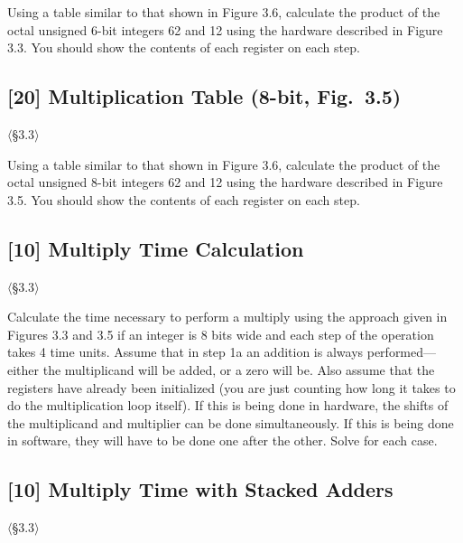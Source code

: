 \noindent Using a table similar to that shown in Figure 3.6, calculate the
product of the octal unsigned 6-bit integers 62 and 12 using the hardware
described in Figure 3.3. You should show the contents of each register on
each step.

\problembreak

\subsection{[20] Multiplication Table (8-bit, Fig.~3.5)}
\hypertarget{prob-3.13}{}
\noindent$\langle$\S3.3$\rangle$\medskip

\noindent Using a table similar to that shown in Figure 3.6, calculate the
product of the octal unsigned 8-bit integers 62 and 12 using the hardware
described in Figure 3.5. You should show the contents of each register on
each step.

\problembreak

\subsection{[10] Multiply Time Calculation}
\hypertarget{prob-3.14}{}
\noindent$\langle$\S3.3$\rangle$\medskip

\noindent Calculate the time necessary to perform a multiply using the
approach given in Figures 3.3 and 3.5 if an integer is 8 bits wide and each
step of the operation takes 4 time units. Assume that in step 1a an addition
is always performed---either the multiplicand will be added, or a zero will
be. Also assume that the registers have already been initialized (you are
just counting how long it takes to do the multiplication loop itself). If
this is being done in hardware, the shifts of the multiplicand and multiplier
can be done simultaneously. If this is being done in software, they will have
to be done one after the other. Solve for each case.

\problembreak

\subsection{[10] Multiply Time with Stacked Adders}
\hypertarget{prob-3.15}{}
\noindent$\langle$\S3.3$\rangle$\medskip

